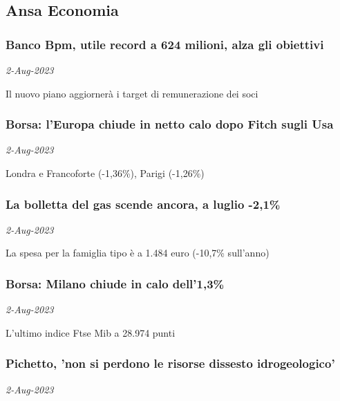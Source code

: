 \subsection{Ansa Economia \href{https://www.ansa.it/sito/notizie/economia/economia.shtml}{}}
\subsubsection{Banco Bpm, utile record a 624 milioni, alza gli obiettivi \href{https://www.ansa.it/sito/notizie/economia/2023/08/02/banco-bpm-utile-record-a-624-milioni-alza-gli-obiettivi_d547cf9c-2f6c-4e5d-939a-76b7b2033279.html}{}}
\textit{2-Aug-2023}

Il nuovo piano aggiorner\`{a} i target di remunerazione dei soci
\subsubsection{Borsa: l'Europa chiude in netto calo dopo Fitch sugli Usa \href{https://www.ansa.it/sito/notizie/economia/2023/08/02/borsa-leuropa-chiude-in-netto-calo-dopo-fitch-sugli-usa_d63e1dda-0da1-49ea-8ef2-2d67e5b7c8c4.html}{}}
\textit{2-Aug-2023}

Londra e Francoforte (-1,36\%), Parigi (-1,26\%)
\subsubsection{La bolletta del gas scende ancora, a luglio -2,1\% \href{https://www.ansa.it/sito/notizie/economia/2023/08/02/la-bolletta-del-gas-scende-ancora-a-luglio-21_ca9238b9-41e6-4b90-8ab6-53932388a060.html}{}}
\textit{2-Aug-2023}

La spesa per la famiglia tipo \`{e} a 1.484 euro (-10,7\% sull'anno)
\subsubsection{Borsa: Milano chiude in calo dell'1,3\% \href{https://www.ansa.it/sito/notizie/economia/2023/08/02/borsa-milano-chiude-in-calo-dell13_87c29f6d-2e40-4ccf-b981-065b491fbc0d.html}{}}
\textit{2-Aug-2023}

L'ultimo indice Ftse Mib a 28.974 punti
\subsubsection{Pichetto, 'non si perdono le risorse dissesto idrogeologico' \href{https://www.ansa.it/sito/notizie/economia/2023/08/02/pichetto-non-si-perdono-le-risorse-dissesto-idrogeologico_7ece366a-e691-4428-a86d-aa894d9b2a0f.html}{}}
\textit{2-Aug-2023}

